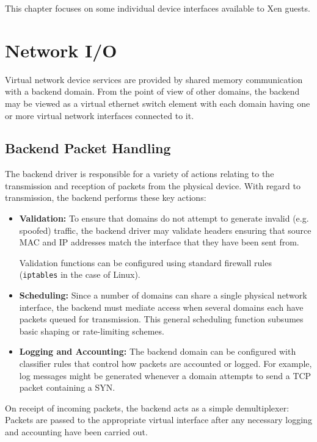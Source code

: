 \documentclass[11pt,twoside,final,openright]{xenstyle}
\begin{document}
This chapter focuses on some individual device interfaces
available to Xen guests. 

\section{Network I/O}

Virtual network device services are provided by shared memory
communication with a backend domain.  From the point of view of
other domains, the backend may be viewed as a virtual ethernet switch
element with each domain having one or more virtual network interfaces
connected to it.

\subsection{Backend Packet Handling}

The backend driver is responsible for a variety of actions relating to
the transmission and reception of packets from the physical device.
With regard to transmission, the backend performs these key actions:

\begin{itemize}
\item {\bf Validation:} To ensure that domains do not attempt to
  generate invalid (e.g. spoofed) traffic, the backend driver may
  validate headers ensuring that source MAC and IP addresses match the
  interface that they have been sent from.

  Validation functions can be configured using standard firewall rules
  ({\small{\tt iptables}} in the case of Linux).
  
\item {\bf Scheduling:} Since a number of domains can share a single
  physical network interface, the backend must mediate access when
  several domains each have packets queued for transmission.  This
  general scheduling function subsumes basic shaping or rate-limiting
  schemes.
  
\item {\bf Logging and Accounting:} The backend domain can be
  configured with classifier rules that control how packets are
  accounted or logged.  For example, log messages might be generated
  whenever a domain attempts to send a TCP packet containing a SYN.
\end{itemize}

On receipt of incoming packets, the backend acts as a simple
demultiplexer:  Packets are passed to the appropriate virtual
interface after any necessary logging and accounting have been carried
out.
\end{document}
